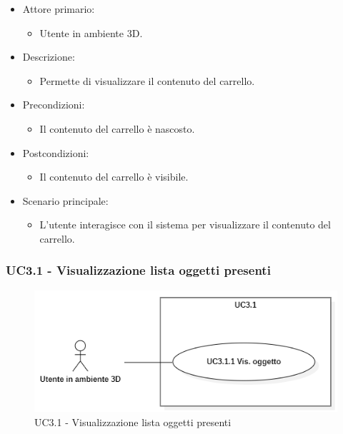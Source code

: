 \begin{itemize}
	
	\item Attore primario: 
	\begin{itemize}
		\item Utente in ambiente 3D.
	\end{itemize}
	\item Descrizione:
	\begin{itemize}
		\item Permette di visualizzare il contenuto del carrello.
	\end{itemize}
	
	\item Precondizioni:
	\begin{itemize}
		\item Il contenuto del carrello è nascosto.
	\end{itemize}
	
	\item Postcondizioni:
	\begin{itemize}
		\item Il contenuto del carrello è visibile.
	\end{itemize}
	
	\item Scenario principale:
	\begin{itemize}
		\item L'utente interagisce con il sistema per visualizzare il contenuto del carrello.
	\end{itemize}
	
\end{itemize}

\subsubsection{UC3.1 - Visualizzazione lista oggetti presenti}

\begin{figure}[H]
  \renewcommand{\thefigure}{2}
  \includegraphics[width=\linewidth]{./res/images/UC3.1.png}
  \caption{UC3.1 - Visualizzazione lista oggetti presenti}
  \label{fig:UC 3.1}
\end{figure}

